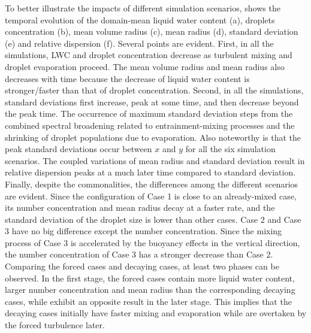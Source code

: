 \documentclass[draft,jgrga]{AGUTeX}
\begin{document}
\begin{article}
To better illustrate the impacts of different simulation scenarios,  shows the temporal evolution of the domain-mean liquid water content (a), droplets concentration (b), 
mean volume radius (c), mean radius (d), standard deviation (e) and relative dispersion (f). Several points are evident. First, in all the simulations, LWC and droplet concentration decrease as turbulent mixing and droplet evaporation proceed. The mean volume radius and mean radius also decreases with time because the decrease of liquid water content is stronger/faster than that of droplet concentration. Second, in all the simulations, standard deviations first increase, peak at some time, and then decrease beyond the peak time. The occurrence of maximum standard deviation steps from the combined spectral broadening related to entrainment-mixing processes and the shrinking of droplet populations due to evaporation. Also noteworthy is that the peak standard deviations occur between $x$ and $y$ for all the six simulation scenarios. The coupled variations of mean radius and standard deviation result in relative dispersion peaks at a much later time compared to standard deviation. Finally, despite the commonalities, the differences among the different scenarios are evident. Since the configuration of Case 1 is close to an already-mixed case, its number concentration and mean radius decay at a faster rate, and the standard deviation of the droplet size is lower than other cases. Case 2 and Case 3 have no big difference except the number concentration. Since the mixing process of Case 3 is accelerated by the buoyancy effects in the vertical direction, the number concentration of Case 3 has a stronger decrease than Case 2. Comparing the forced cases and decaying cases, at least two phases can be observed. In the first stage, the forced cases contain more liquid water content, larger number concentration and mean radius than the corresponding decaying cases, while exhibit an opposite result in the later stage. This implies that the decaying cases initially have faster mixing and evaporation while are overtaken by the forced turbulence later. 
  

\end{article}
\end{document}
